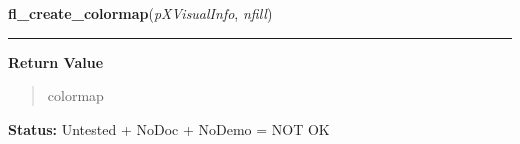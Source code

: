     \label{xformslib:library:fl_create_colormap}

    \vspace{0.5ex}

\hspace{.8\funcindent}\begin{boxedminipage}{\funcwidth}

    \raggedright \textbf{fl\_create\_colormap}(\textit{pXVisualInfo}, \textit{nfill})

    \vspace{-1.5ex}

    \rule{\textwidth}{0.5\fboxrule}
\setlength{\parskip}{2ex}
\setlength{\parskip}{1ex}
      \textbf{Return Value}
    \vspace{-1ex}

      \begin{quote}
      colormap

      \end{quote}

\textbf{Status:} Untested + NoDoc + NoDemo = NOT OK



    \end{boxedminipage}

    \label{xformslib:library:fl_wingeometry}

    \vspace{0.5ex}

